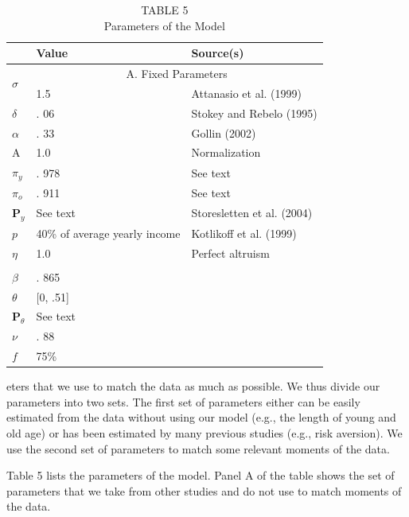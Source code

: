 \documentclass[10pt]{article}
\begin{document}
\begin{table}[h]
\begin{center}
\captionsetup{labelformat=empty}
\caption{TABLE 5\\
Parameters of the Model}
\begin{tabular}{|l|l|l|}
\hline
 & Value & Source(s) \\
\hline
\multirow[b]{2}{*}{$\sigma$} & \multicolumn{2}{|c|}{A. Fixed Parameters} \\
\hline
 & 1.5 & Attanasio et al. (1999) \\
\hline
$\delta$ & . 06 & Stokey and Rebelo (1995) \\
\hline
$\alpha$ & . 33 & Gollin (2002) \\
\hline
A & 1.0 & Normalization \\
\hline
$\pi_{y}$ & . 978 & See text \\
\hline
$\pi_{o}$ & . 911 & See text \\
\hline
$\mathbf{P}_{y}$ & See text & Storesletten et al. (2004) \\
\hline
$p$ & 40\% of average yearly income & Kotlikoff et al. (1999) \\
\hline
$\eta$ & 1.0 & Perfect altruism \\
\hline
 &  &  \\
\hline
$\beta$ & . 865 &  \\
\hline
$\theta$ & [0, .51] &  \\
\hline
$\mathbf{P}_{\theta}$ & See text &  \\
\hline
$\nu$ & . 88 &  \\
\hline
$f$ & 75\% &  \\
\hline
\end{tabular}
\end{center}
\end{table}

eters that we use to match the data as much as possible. We thus divide our parameters into two sets. The first set of parameters either can be easily estimated from the data without using our model (e.g., the length of young and old age) or has been estimated by many previous studies (e.g., risk aversion). We use the second set of parameters to match some relevant moments of the data.

Table 5 lists the parameters of the model. Panel A of the table shows the set of parameters that we take from other studies and do not use to match moments of the data.
\end{document}
